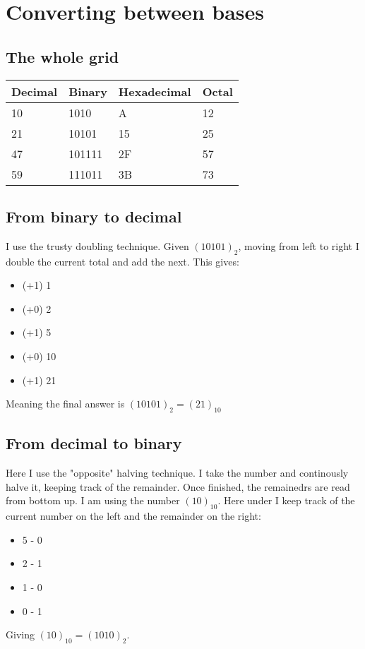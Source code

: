 \documentclass{article}
\begin{document}
\section{Converting between bases}
\subsection{The whole grid}
\begin{table}[h]
    \centering
    \begin{tabular}{llll}
    Decimal                    & Binary                        & Hexadecimal                & Octal                      \\ \hline
    \cellcolor[HTML]{EFEFEF}10 & 1010                          & A                          & 12                         \\
    21                         & \cellcolor[HTML]{EFEFEF}10101 & 15                         & 25                         \\
    47                         & 101111                        & \cellcolor[HTML]{EFEFEF}2F & 57                         \\
    59                         & 111011                        & 3B                         & \cellcolor[HTML]{EFEFEF}73
    \end{tabular}
    \end{table}


\subsection{From binary to decimal}
I use the trusty doubling technique. Given $(10101)_2$, moving from left to right I double the current total and add the next. This gives:
\begin{itemize}
    \item{(+1) 1}
    \item{(+0) 2}
    \item{(+1) 5}
    \item{(+0) 10}
    \item{(+1) 21}
\end{itemize}
Meaning the final answer is $(10101)_2 = (21)_{10}$

\subsection{From decimal to binary}
Here I use the "opposite" halving technique. I take the number and continously halve it, keeping track of the remainder. Once finished, the remainedrs are read from bottom up.
I am using the number $(10)_{10}$. Here under I keep track of the current number on the left and the remainder on the right:
\begin{itemize}
    \item{5 - 0}
    \item{2 - 1}
    \item{1 - 0}
    \item{0 - 1}
\end{itemize}
Giving $(10)_{10} = (1010)_2$.
\end{document}
